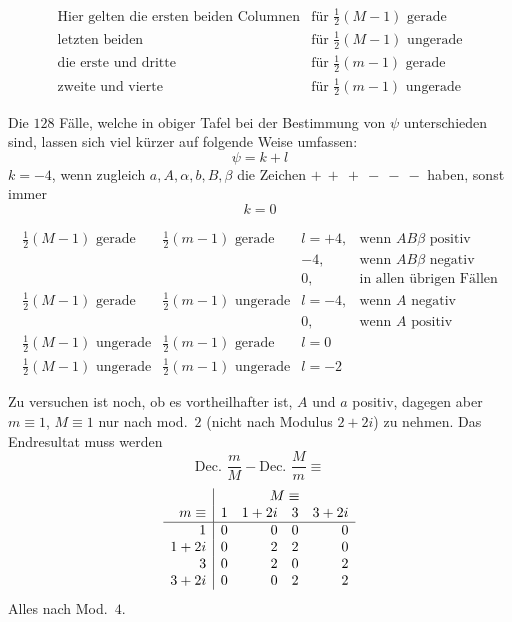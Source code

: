 \[
\begin{array}{lll}
\text{Hier gelten die ersten beiden Columnen}&\text{für }\frac12(M-1)\text{ gerade}\\
\text{letzten beiden}&\text{für }\frac12(M-1)\text{ ungerade}\\
\text{die erste und dritte}&\text{für }\frac12(m-1)\text{ gerade}\\
\text{zweite und vierte}&\text{für }\frac12(m-1)\text{ ungerade}
\end{array}
\]

%
Die $128$ Fälle, welche in obiger Tafel bei der Bestimmung von $\psi$ unterschieden sind, lassen sich viel kürzer auf folgende Weise umfassen:
\[
\psi=k+l
\]
$k=-4$, wenn zugleich $a,A,\alpha,b,B,\beta$ die Zeichen $+\ +\ +\ -\ -\ -$ haben, sonst immer
\[
k=0
\]

\begingroup\small\setlength{\arraycolsep}{3pt}
\[
\begin{array}{ll|ll}
\frac12(M-1)\text{ gerade}&\frac12(m-1)\text{ gerade}&l=+4,&\text{wenn }AB\beta\text{ positiv}\\
&&-4,&\text{wenn }AB\beta\text{ negativ}\\
&&0,&\text{in allen übrigen Fällen}\\[3pt]
\frac12(M-1)\text{ gerade}&\frac12(m-1)\text{ ungerade}&l=-4,&\text{wenn }A\text{ negativ}\\
&&0,&\text{wenn }A\text{ positiv}\\[3pt]
\frac12(M-1)\text{ ungerade}&\frac12(m-1)\text{ gerade}&l=0&\\[3pt]
\frac12(M-1)\text{ ungerade}&\frac12(m-1)\text{ ungerade}&l=-2&
\end{array}
\]
\endgroup

Zu versuchen ist noch, ob es vortheilhafter ist, $A$ und $a$ positiv, dagegen aber $m\equiv1$, $M\equiv1$ nur nach mod.\ $2$ (nicht nach Modulus $2+2i$) zu nehmen. Das Endresultat muss werden
\[
\text{Dec. }\frac mM-\text{Dec. }\frac Mm\equiv
\]
\[
\begin{array}{r|rrrr}
&\multicolumn{4}{c}{M\equiv}\\
m\equiv&1&1+2i&3&3+2i\\\hline
1&0&0&0&0\\
1+2i&0&2&2&0\\
3&0&2&0&2\\
3+2i&0&0&2&2
\end{array}
\]
Alles nach Mod.\ $4$.


